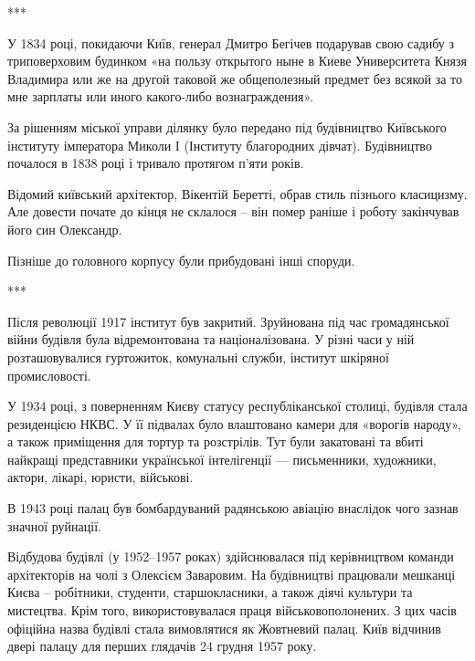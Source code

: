 ***

У 1834 році, покидаючи Київ, генерал Дмитро Бегічев подарував свою садибу з
триповерховим будинком «на пользу открытого ныне в Киеве Университета Князя
Владимира или же на другой таковой же общеполезный предмет без всякой за то мне
зарплаты или иного какого-либо вознаграждения». 

За рішенням міської управи ділянку було передано під будівництво Київського
інституту імператора Миколи I (Інституту благородних дівчат). Будівництво
почалося в 1838 році і тривало протягом п'яти років.


Відомий київський архітектор, Вікентій Беретті, обрав стиль пізнього
класицизму. Але довести почате до кінця не склалося – він помер раніше і роботу
закінчував його син Олександр. 


Пізніше до головного корпусу були прибудовані інші споруди.

***

Після революції 1917 інститут був закритий. Зруйнована під час громадянської
війни будівля була відремонтована та націоналізована. У різні часи у ній
розташовувалися гуртожиток, комунальні служби, інститут шкіряної промисловості. 

У 1934 році, з поверненням Києву статусу республіканської столиці, будівля
стала резиденцією НКВС. У її підвалах було влаштовано камери для «ворогів
народу», а також приміщення для тортур та розстрілів. Тут були закатовані та
вбиті найкращі представники української інтелігенції — письменники, художники,
актори, лікарі, юристи, військові. 

\begin{multicols}{2} %
\setlength{\parindent}{0pt}


\end{multicols} %

В 1943 році палац був бомбардуваний радянською авіацію внаслідок чого зазнав
значної руйнації.

Відбудова будівлі (у 1952–1957 роках) здійснювалася під керівництвом команди
архітекторів на чолі з  Олексієм Заваровим. На будівництві працювали мешканці
Києва – робітники, студенти, старшокласники, а також діячі культури та
мистецтва. Крім того, використовувалася праця військовополонених. З цих часів
офіційна назва будівлі стала вимовлятися як Жовтневий палац. Київ відчинив
двері палацу для перших глядачів 24 грудня 1957 року.

